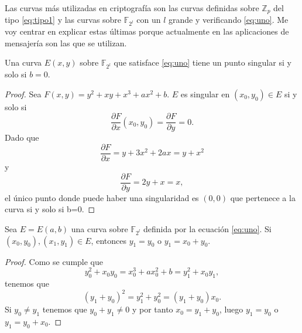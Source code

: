 Las curvas más utilizadas en criptografía son las curvas definidas sobre $\mathbb{Z}_p$ del tipo \eqref{eq:tipo1} y las curvas sobre $\mathbb{F}_{2^l}$ con un $l$ grande y verificando \eqref{eq:uno}. Me voy centrar en explicar estas últimas porque actualmente en las aplicaciones de mensajería son las que se utilizan.

\begin{proposicion}
	Una curva $E(x,y)$ sobre $\mathbb{F}_{2^l}$ que satisface \eqref{eq:uno} tiene un punto singular si y solo si $b=0$.
\end{proposicion}
\begin{proof}
	Sea $F(x,y)=y^2+xy+x^3+ax^2+b$. $E$ es singular en $(x_0,y_0)\in E$ si y solo si  
	$$
		\frac{\partial F}{\partial x}(x_0,y_0)=\frac{\partial F}{\partial y}=0.
	$$
	Dado que
	$$
		\frac{\partial F}{\partial x} = y+3x^2+2ax=y+x^2
	$$
	y
	$$
		\frac{\partial F}{\partial y}=2y+x=x,
	$$
	el único punto donde puede haber una singularidad es $(0,0)$ que pertenece a la curva si y solo si b=0.
\end{proof}

\begin{lema}
	Sea $E=E(a,b)$ una curva sobre $\mathbb{F}_{2^l}$ definida por la ecuación \eqref{eq:uno}. Si $(x_0,y_0), (x_1,y_1)\in E$, entonces $y_1=y_0$ o $y_1=x_0+y_0$.
\end{lema}
\begin{proof}
	Como se cumple que
	$$
		y_0^2+x_0y_0=x_0^3+ax_0^2+b=y_1^2+x_0y_1,
	$$
	tenemos que
	$$
		(y_1+y_0)^2=y_1^2+y_0^2=(y_1+y_0)x_0.
	$$
	Si $y_0\neq y_1$ tenemos que $y_0+y_1\neq0$ y por tanto $x_0=y_1+y_0$, luego $y_1=y_0$ o $y_1=y_0+x_0$.
\end{proof}


